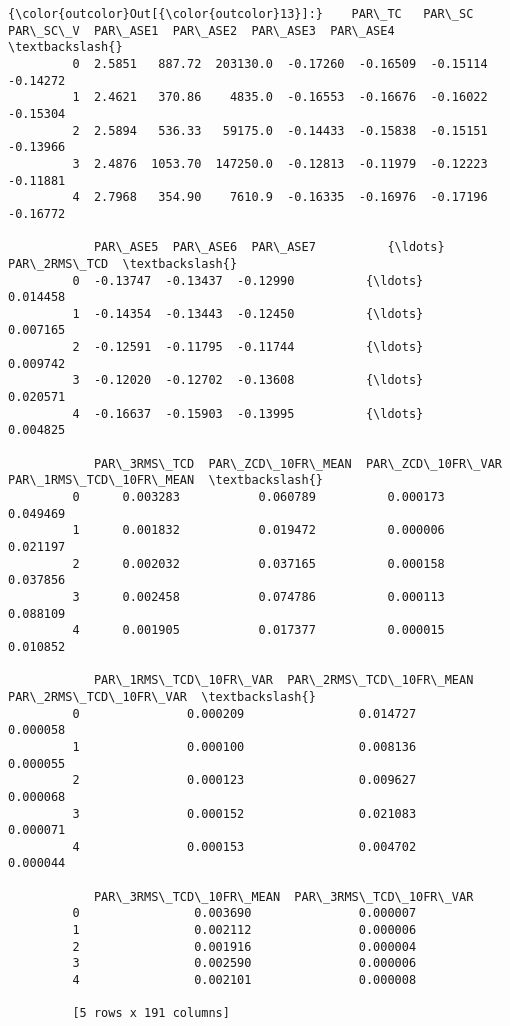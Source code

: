 \documentclass[11pt]{article}
\begin{document}
\begin{Verbatim}[commandchars=\\\{\}]
{\color{outcolor}Out[{\color{outcolor}13}]:}    PAR\_TC   PAR\_SC  PAR\_SC\_V  PAR\_ASE1  PAR\_ASE2  PAR\_ASE3  PAR\_ASE4  \textbackslash{}
         0  2.5851   887.72  203130.0  -0.17260  -0.16509  -0.15114  -0.14272   
         1  2.4621   370.86    4835.0  -0.16553  -0.16676  -0.16022  -0.15304   
         2  2.5894   536.33   59175.0  -0.14433  -0.15838  -0.15151  -0.13966   
         3  2.4876  1053.70  147250.0  -0.12813  -0.11979  -0.12223  -0.11881   
         4  2.7968   354.90    7610.9  -0.16335  -0.16976  -0.17196  -0.16772   
         
            PAR\_ASE5  PAR\_ASE6  PAR\_ASE7          {\ldots}            PAR\_2RMS\_TCD  \textbackslash{}
         0  -0.13747  -0.13437  -0.12990          {\ldots}                0.014458   
         1  -0.14354  -0.13443  -0.12450          {\ldots}                0.007165   
         2  -0.12591  -0.11795  -0.11744          {\ldots}                0.009742   
         3  -0.12020  -0.12702  -0.13608          {\ldots}                0.020571   
         4  -0.16637  -0.15903  -0.13995          {\ldots}                0.004825   
         
            PAR\_3RMS\_TCD  PAR\_ZCD\_10FR\_MEAN  PAR\_ZCD\_10FR\_VAR  PAR\_1RMS\_TCD\_10FR\_MEAN  \textbackslash{}
         0      0.003283           0.060789          0.000173                0.049469   
         1      0.001832           0.019472          0.000006                0.021197   
         2      0.002032           0.037165          0.000158                0.037856   
         3      0.002458           0.074786          0.000113                0.088109   
         4      0.001905           0.017377          0.000015                0.010852   
         
            PAR\_1RMS\_TCD\_10FR\_VAR  PAR\_2RMS\_TCD\_10FR\_MEAN  PAR\_2RMS\_TCD\_10FR\_VAR  \textbackslash{}
         0               0.000209                0.014727               0.000058   
         1               0.000100                0.008136               0.000055   
         2               0.000123                0.009627               0.000068   
         3               0.000152                0.021083               0.000071   
         4               0.000153                0.004702               0.000044   
         
            PAR\_3RMS\_TCD\_10FR\_MEAN  PAR\_3RMS\_TCD\_10FR\_VAR  
         0                0.003690               0.000007  
         1                0.002112               0.000006  
         2                0.001916               0.000004  
         3                0.002590               0.000006  
         4                0.002101               0.000008  
         
         [5 rows x 191 columns]
\end{Verbatim}
            
\end{document}
